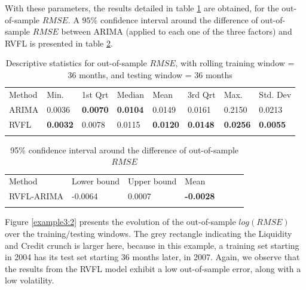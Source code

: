 \medskip

With these parameters, the results detailed in table \ref{tab:freddatatables4} are obtained, for the out-of-sample $RMSE$. A $95\%$ confidence interval around the difference of out-of-sample $RMSE$ between ARIMA (applied to each one of the three factors) and RVFL is presented in table \ref{tab:confint3}.

\begin{table}[!htb]
\begin{center}
\caption{Descriptive statistics for out-of-sample $RMSE$, with rolling training window = 36 months, and testing window = 36 months}
\label{tab:freddatatables4}       %
\begin{tabular}{llllllll}
\hline\noalign{\smallskip}
Method & Min. & 1st Qrt & Median & Mean & 3rd Qrt & Max. & Std. Dev\\
\noalign{\smallskip}\hline\noalign{\smallskip}
  ARIMA   & 0.0036  & \textbf{0.0070}  & \textbf{0.0104}  & 0.0149  & 0.0161  & 0.2150 & 0.0213\\
  RVFL    & \textbf{0.0032}  & 0.0078  & 0.0115  & \textbf{0.0120}  & \textbf{0.0148}  & \textbf{0.0256} & \textbf{0.0055}\\
\noalign{\smallskip}\hline
\end{tabular}
\end{center}
\end{table}

\begin{table}[!htb]
\begin{center}
\caption{95\% confidence interval around the difference of out-of-sample $RMSE$}
\label{tab:confint3}       %
\begin{tabular}{lllllll}
\hline\noalign{\smallskip}
Method & Lower bound & Upper bound  & Mean \\
\noalign{\smallskip}\hline\noalign{\smallskip}
  RVFL-ARIMA & -0.0064 & 0.0007 & \textbf{-0.0028} \\
\noalign{\smallskip}\hline
\end{tabular}
\end{center}
\end{table}

Figure \ref{example3:2} presents the evolution of the out-of-sample $log(RMSE)$ over the training/testing windows. The grey rectangle indicating the Liquidity and Credit crunch is larger here, because in this example, a training set starting in 2004 has its test set starting 36 months later, in 2007. Again, we observe that the results from the RVFL model exhibit a low out-of-sample error, along with a low volatility.

